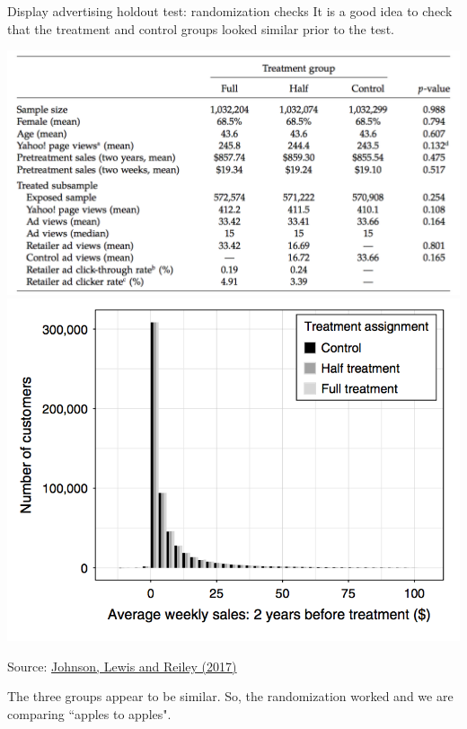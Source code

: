 \documentclass[10pt, aspectratio=169]{beamer}
\newcommand{\source}[1]{\begin{flushright} \footnotesize Source: {#1} \end{flushright} \normalsize}
\begin{document}
\begin{frame}{Display advertising holdout test: randomization checks}
It is a good idea to check that the treatment and control groups looked similar prior to the test. \\
\begin{center}
\includegraphics[height=0.4\textheight]{images/johnsonetalrandomizationcheck.png} \vspace{1cm}
\includegraphics[height=0.4\textheight]{images/johnsonetalrandomizationcheck2.png}
\end{center}
\source{\href{https://drive.google.com/uc?export=download&id=0B0EzanlzLNsWWDhnZ0FKOWktQ1U}{Johnson, Lewis and Reiley (2017)}}
\alert{The three groups appear to be similar.  So, the randomization worked and we are comparing ``apples to apples".}
\end{frame}
\end{document}
